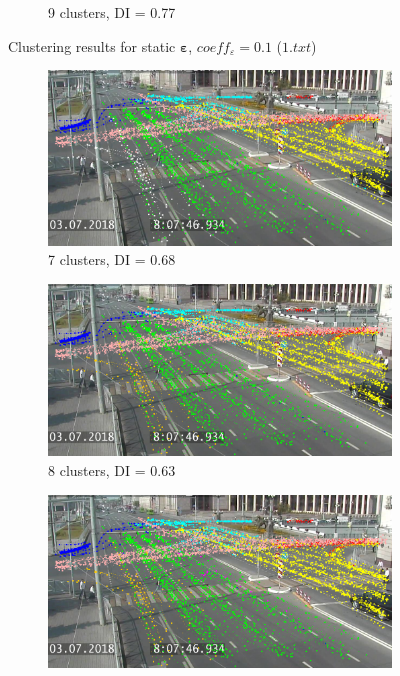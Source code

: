 \begin{figure}[!htb]
\begin{subfigure}[!htb]{0.495\textwidth}
		\caption{9 clusters, DI = 0.77}
		\label{fig:1-9cl-01}
	\end{subfigure}
	\caption{Clustering results for static $\bm{\varepsilon}$, $coeff_\varepsilon = 0.1$ ($1.txt$)}
	\label{fig:clust-res-1-01}
\end{figure}

\begin{figure}[!htb]
	\centering
	\begin{subfigure}[!htb]{0.495\textwidth}
		\centering{}
		\includegraphics[width=\textwidth]{images/cl-res/1-7cl-015.png}
		\caption{7 clusters, DI = 0.68}
		\label{fig:1-7cl-015}
	\end{subfigure}
	\hfill
	\begin{subfigure}[!htb]{0.495\textwidth}
		\centering{}
		\includegraphics[width=\textwidth]{images/cl-res/1-8cl-015.png}
		\caption{8 clusters, DI = 0.63}
		\label{fig:1-8cl-015}
	\end{subfigure}
	\hfill
	\begin{subfigure}[!htb]{0.495\textwidth}
		\centering{}
		\includegraphics[width=\textwidth]{images/cl-res/1-9cl-015.png}

\end{subfigure}
\end{figure}
